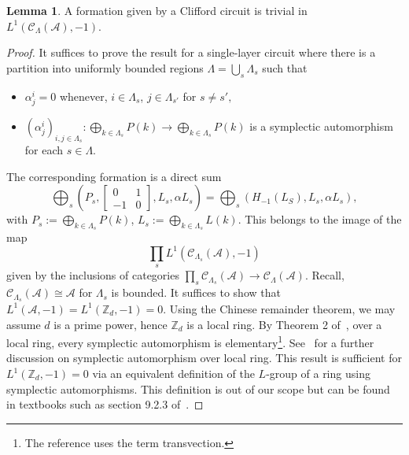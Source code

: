\documentclass{article}
\theoremstyle{definition}
\newtheorem{lem}[theorem]{Lemma}
\newcommand{\CA}{{ \mathcal A}}
\newcommand{\CalC}{{\mathcal C}}
\newcommand{\ZZ}{{\mathbb Z}}
\def \al {\alpha}
\newcommand{\A}{\mathcal A}
\begin{document}
\begin{lem} \label{circuittrivial}
    A formation given by a Clifford circuit is trivial in $L^1(\mathcal{C}_{\Lambda}(\CA), -1)$.
\end{lem}
\begin{proof}
    It suffices to prove the result for a single-layer circuit where there is a partition into uniformly bounded regions $\Lambda=\bigcup_{s}\Lambda_s$ such that
    \begin{itemize}
        \item $\alpha_j^i=0$ whenever, $i\in \Lambda_s$, $j\in \Lambda_{s'}$ for $s\ne s',$
        \item $(\alpha_j^i)_{i, j \in \Lambda_s}: \bigoplus_{k\in \Lambda_s} P(k) \rightarrow \bigoplus_{k\in \Lambda_s} P(k)$ is a symplectic automorphism for each $s\in \Lambda$. 
    \end{itemize} 
    The corresponding formation is a direct sum 
    $$\bigoplus_{s}\left(P_s, \begin{bmatrix}
        0 & 1\\
        -1 & 0
    \end{bmatrix}, L_s, \al L_s\right)=\bigoplus_{s}\left(H_{-1}(L_S), L_s, \al L_s\right),$$ with $P_s:=\bigoplus_{k\in \Lambda_s} P(k)$, $L_s:=\bigoplus_{k\in \Lambda_s} L(k)$.
    This belongs to the image of the map $$\prod_s L^1(\CalC_{\Lambda_s}(\A), -1)$$ given by the inclusions of categories $\prod_s\CalC_{\Lambda_s}(\A)\rightarrow \CalC_{\Lambda}(\A)$. Recall, $\CalC_{\Lambda_s}(\A)\cong \A$ for $\Lambda_s$ is bounded. It suffices to show that $L^1(\A, -1)=L^1(\ZZ_d, -1)=0$. Using the Chinese remainder theorem, we may assume $d$ is a prime power, hence $\ZZ_d$ is a local ring. By Theorem 2 of~\cite{klingenberg1963symplectic}, over a local ring, every symplectic automorphism is elementary\footnote{The reference uses the term transvection.}. See~\cite{ishibashi1999groups} for a further discussion on symplectic automorphism over local ring. This result is sufficient for $L^1(\ZZ_d, -1)=0$ via an equivalent definition of the $L$-group of a ring using symplectic automorphisms. This definition is out of our scope but can be found in textbooks such as section 9.2.3 of~\cite{luck2024surgery}. 
\end{proof}
\end{document}
